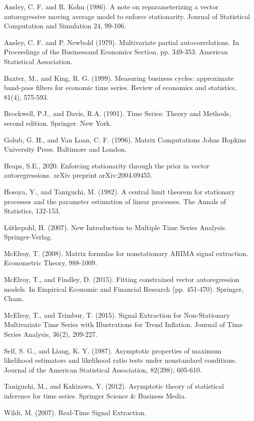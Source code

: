 \documentclass[a4paper]{book}
\begin{document}



\begin{thebibliography}{99}

\bibitem{} Ansley, C. F. and R. Kohn (1986).
A note on reparameterizing a vector autoregressive moving average
model to enforce stationarity. 
  Journal of Statistical Computation and Simulation 24, 99-106.
  
\bibitem{}  Ansley, C. F. and P. Newbold (1979). Multivariate partial autocorrelations. 
  In Proceedings of the Businessand Economics Section, pp. 349-353.
  American Statistical Association.

\bibitem{} Baxter, M., and King, R. G. (1999). Measuring business cycles: approximate band-pass filters for economic time series. Review of economics and statistics, 81(4), 575-593.

\bibitem{} Brockwell, P.J., and Davis, R.A. (1991).  
  Time Series: Theory and Methods, second edition.   Springer. New York.

\bibitem{} Golub, G. H., and Van Loan, C. F. (1996). Matrix Computations Johns Hopkins University Press. Baltimore and London.


\bibitem{} Heaps, S.E., 2020. Enforcing stationarity through the prior in vector autoregressions. arXiv preprint arXiv:2004.09455.

\bibitem{} Hosoya, Y., and Taniguchi, M. (1982). A central limit theorem for stationary processes and the parameter estimation of linear processes. The Annals of Statistics, 132-153.

\bibitem{} L\"utkepohl, H. (2007).  New Introduction to Multiple Time Series Analysis. 
Springer-Verlag. 

\bibitem{} McElroy, T. (2008). Matrix formulas for nonstationary ARIMA signal extraction. Econometric Theory, 988-1009.

\bibitem{} McElroy, T., and Findley, D. (2015). Fitting constrained vector autoregression models. In Empirical Economic and Financial Research (pp. 451-470). Springer, Cham.

\bibitem{} McElroy, T., and Trimbur, T. (2015). Signal Extraction for Non-Stationary Multivariate Time Series with Illustrations for Trend Inflation. Journal of Time 
Series Analysis, 36(2), 209-227.

\bibitem{} Self, S. G., and Liang, K. Y. (1987). Asymptotic properties of maximum likelihood estimators and likelihood ratio tests under nonstandard conditions. Journal of the American Statistical Association, 82(398), 605-610.

\bibitem{} Taniguchi, M., and Kakizawa, Y. (2012). Asymptotic theory of statistical inference for time series. Springer Science \& Business Media.

\bibitem{} Wildi, M. (2007). Real-Time Signal Extraction.

\end{thebibliography}


\end{document}
